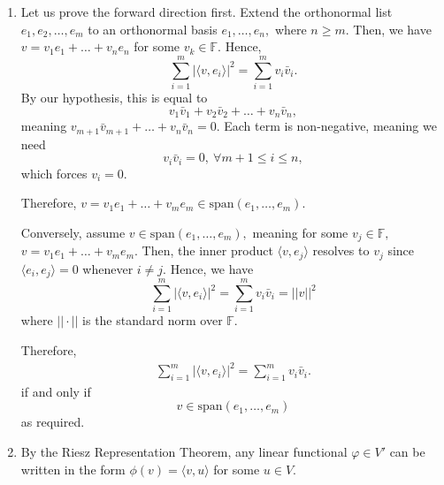 \documentclass[12pt]{article}
\begin{document}
\begin{enumerate}
\begin{enumerate}
      \item Suppose we have a $c > 0$ for which $||f(t)|| = c$  for
        all $t \in \mathbb R.$ Then, $\langle f(t), f(t) \rangle =
        c^2,$ and differentiating yields
        $$
        \langle f'(t), f(t)\rangle + \langle f(t), f'(t)\rangle = 0.
        $$
        Since this is over the field $\mathbb R$, the inner product
        is symmetric, and we can therefore conclude
        $$
        \langle f'(t), f(t)\rangle = 0
        $$
        for all $t \in \mathbb R.$

      \item Tangent vector to curve is orthogonal to displacement.
    \end{enumerate}

  \item Let us prove the forward direction first. Extend the
    orthonormal list $e_1, e_2, \ldots, e_m$ to an orthonormal basis
    $e_1, \ldots, e_n,$ where $n \geq m.$ Then, we have $v = v_1 e_1
    + \ldots + v_n e_n$ for some $v_k \in \mathbb F.$ Hence,
    $$
    \sum_{i = 1}^{m} |\langle v, e_i\rangle |^2 = \sum_{i = 1}^{m} v_i \bar v_i.
    $$
    By our hypothesis, this is equal to $$
    v_1 \bar v_1 + v_2 \bar v_2 + \ldots + v_n \bar v_n,
    $$
    meaning $v_{m + 1} \bar v_{m + 1} + \ldots + v_{n} \bar v_{n}=
    0.$ Each term is non-negative, meaning we need
    $$
    v_{i} \bar v_i = 0, \ \forall m + 1 \leq i  \leq n,
    $$
    which forces $v_i = 0.$

    Therefore, $v = v_1 e_1 + \ldots + v_m e_m \in \text{span}(e_1,
    \ldots, e_m).$

    Conversely, assume $v \in \text{span}(e_1, \ldots, e_m),$ meaning
    for some $v_j \in \mathbb F,$ $v = v_1 e_1 + \ldots + v_me_m.$
    Then, the inner product $\langle v, e_j \rangle$ resolves to
    $v_j$ since $\langle e_i, e_j \rangle = 0$ whenever $i \neq j.$
    Hence, we have
    $$
    \sum_{i = 1}^{m} | \langle v, e_i \rangle|^2 = \sum_{i = 1}^{m}
    v_i \bar v_i = ||v||^2
    $$
    where $|| \cdot ||$ is the standard norm over $\mathbb F.$

    Therefore,
    \begin{align*}
      \sum_{i = 1}^{m} |\langle v, e_i\rangle |^2 = \sum_{i = 1}^{m}
      v_i \bar v_i.
    \end{align*}
    if and only if $$
    v \in \text{span}(e_1, \ldots, e_m)
    $$
    as required.

  \item By the Riesz Representation Theorem, any linear functional
    $\varphi \in V'$ can be written in the form $\phi(v) = \langle v,
    u \rangle$ for some $u \in V.$


\end{enumerate}
\end{document}
